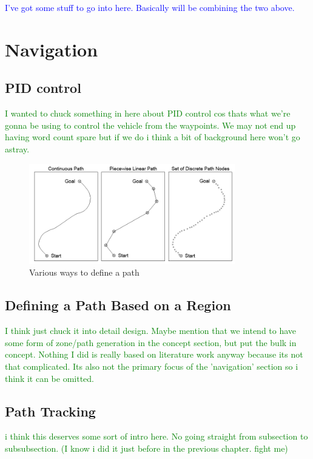 \documentclass[main.tex]{subfiles}
\begin{document}
\textcolor{blue}{I've got some stuff to go into here. Basically will be combining the two above.}

\section{Navigation}
\subsection{PID control}
\textcolor{green}{I wanted to chuck something in here about PID control cos thats what we're gonna be using to control the vehicle from the waypoints. We may not end up having word count spare but if we do i think a bit of background here won't go astray.}


\begin{figure}[ht]
\includegraphics[width=0.8\textwidth]{3-LiteratureReview/pathDefining.png}
\centering
\caption[Various ways to define a path]{Various ways to define a path \parencite{Giesbrecht2005}} 
\end{figure}

\subsection{Defining a Path Based on a Region}
\textbf{\color{red}{JONO CAN YOU TALK ABOUT DIFFERENT METHODS DO DEFINE A PATH BASED ON A REGION HERE, or maybe we dont even need to mention it, put in detailed design?}} \textcolor{green}{I think just chuck it into detail design. Maybe mention that we intend to have some form of zone/path generation in the concept section, but put the bulk in concept. Nothing I did is really based on literature work anyway because its not that complicated. Its also not the primary focus of the 'navigation' section so i think it can be omitted.}

\subsection{Path Tracking}
\textcolor{green}{i think this deserves some sort of intro here. No going straight from subsection to subsubsection. (I know i did it just before in the previous chapter. fight me)}
\end{document}
